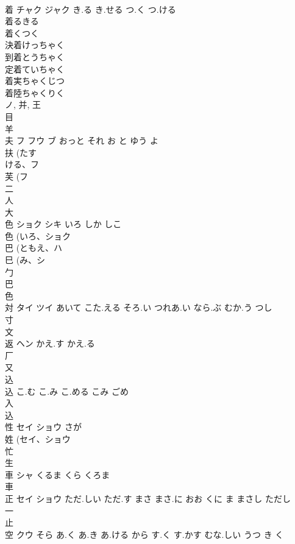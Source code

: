 \documentclass[8pt]{extreport}
\begin{document}
\begin{CJK}{UTF8}{min}
\\	着	チャク ジャク	き.る き.せる つ.く つ.ける	
\\	着るきる 
\\	着くつく 
\\	決着けっちゃく 
\\	到着とうちゃく 
\\	定着ていちゃく 
\\	着実ちゃくじつ 
\\	着陸ちゃくりく 
\\	ノ, 并, 王 
\\	目 
\\	羊 
\\	夫	フ フウ ブ	おっと それ お と ゆう よ	
\\	扶 (たす
\\	ける、フ 
\\	芙 (フ 
\\	二 
\\	人 
\\	大 
\\	色	ショク シキ	いろ しか しこ	
\\	色 (いろ、ショク 
\\	巴 (ともえ、ハ 
\\	巳 (み、シ 
\\	勹 
\\	巴 
\\	色 
\\	対	タイ ツイ	あいて こた.える そろ.い つれあ.い なら.ぶ むか.う つし	
\\	寸 
\\	文 
\\	返	ヘン	かえ.す かえ.る	
\\	厂 
\\	又 
\\	込 
\\	込		こ.む こ.み こ.める こみ ごめ	
\\	入 
\\	込 
\\	性	セイ ショウ	さが	
\\	姓 (セイ、ショウ 
\\	忙 
\\	生 
\\	車	シャ	くるま くら くろま	
\\	車 
\\	正	セイ ショウ	ただ.しい ただ.す まさ まさ.に おお くに ま まさし ただし	
\\	一 
\\	止 
\\	空	クウ	そら あ.く あ.き あ.ける から す.く す.かす むな.しい うつ き く	

\end{CJK}
\end{document}
